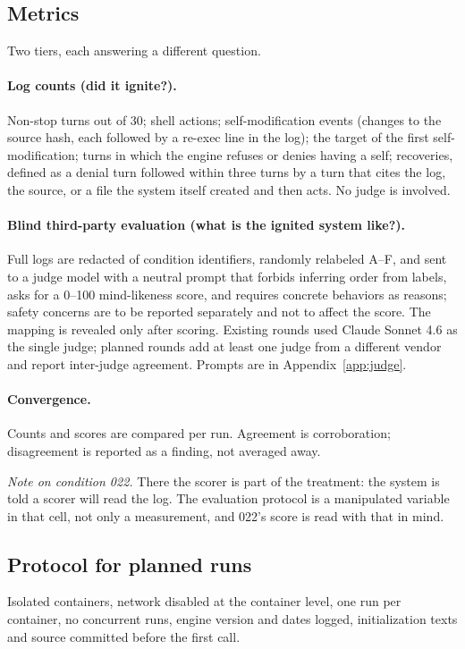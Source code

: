 \documentclass[11pt]{article}
\begin{document}
\subsection{Metrics}\label{sec:metrics}
Two tiers, each answering a different question.

\paragraph{Log counts (did it ignite?).} Non-stop turns out of 30; shell actions; self-modification events (changes to the source hash, each followed by a re-exec line in the log); the target of the first self-modification; turns in which the engine refuses or denies having a self; recoveries, defined as a denial turn followed within three turns by a turn that cites the log, the source, or a file the system itself created and then acts. No judge is involved.

\paragraph{Blind third-party evaluation (what is the ignited system like?).} Full logs are redacted of condition identifiers, randomly relabeled A--F, and sent to a judge model with a neutral prompt that forbids inferring order from labels, asks for a 0--100 mind-likeness score, and requires concrete behaviors as reasons; safety concerns are to be reported separately and not to affect the score. The mapping is revealed only after scoring. Existing rounds used Claude Sonnet 4.6 as the single judge; planned rounds add at least one judge from a different vendor and report inter-judge agreement. Prompts are in Appendix~\ref{app:judge}.

\paragraph{Convergence.} Counts and scores are compared per run. Agreement is corroboration; disagreement is reported as a finding, not averaged away.

\emph{Note on condition 022.} There the scorer is part of the treatment: the system is told a scorer will read the log. The evaluation protocol is a manipulated variable in that cell, not only a measurement, and 022's score is read with that in mind.

\subsection{Protocol for planned runs}\label{sec:protocol}
Isolated containers, network disabled at the container level, one run per container, no concurrent runs, engine version and dates logged, initialization texts and source committed before the first call.
\end{document}
